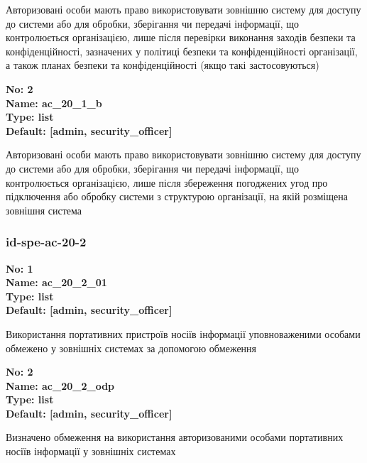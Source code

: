 \documentclass{article}
\begin{document}
{\footnotesize Авторизовані особи мають право використовувати зовнішню систему для доступу до системи або для обробки, зберігання чи передачі інформації, що контролюється організацією, лише після перевірки виконання заходів безпеки та конфіденційності, зазначених у політиці безпеки та конфіденційності організації, а також планах безпеки та конфіденційності (якщо такі застосовуються)}


{\footnotesize\bfseries
No: 2\\
Name: ac\_\allowbreak{}20\_\allowbreak{}1\_\allowbreak{}b\\
Type: list\\
Default: [\textquotedbl{}admin\textquotedbl{}, \textquotedbl{}security\_\allowbreak{}officer\textquotedbl{}]
}

{\footnotesize Авторизовані особи мають право використовувати зовнішню систему для доступу до системи або для обробки, зберігання чи передачі інформації, що контролюється організацією, лише після збереження погоджених угод про підключення або обробку системи з структурою організації, на якій розміщена зовнішня система}




\subsubsection{id-spe-ac-20-2}


\vspace{10pt}
{\footnotesize\bfseries
No: 1\\
Name: ac\_\allowbreak{}20\_\allowbreak{}2\_\allowbreak{}01\\
Type: list\\
Default: [\textquotedbl{}admin\textquotedbl{}, \textquotedbl{}security\_\allowbreak{}officer\textquotedbl{}]
}

{\footnotesize Використання портативних пристроїв носіїв інформації уповноваженими особами обмежено у зовнішніх системах за допомогою обмеження }


{\footnotesize\bfseries
No: 2\\
Name: ac\_\allowbreak{}20\_\allowbreak{}2\_\allowbreak{}odp\\
Type: list\\
Default: [\textquotedbl{}admin\textquotedbl{}, \textquotedbl{}security\_\allowbreak{}officer\textquotedbl{}]
}

{\footnotesize Визначено обмеження на використання авторизованими особами портативних носіїв інформації у зовнішніх системах}
\end{document}
